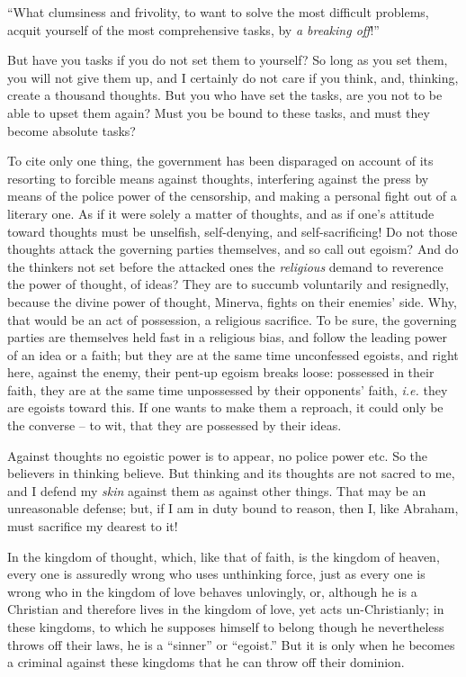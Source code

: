 \documentclass[12pt,a4paper]{book}
\begin{document}
``What clumsiness and frivolity, to want to solve the most difficult 
problems, acquit yourself of the most comprehensive tasks, by \textit{a 
breaking off}!''

But have you tasks if you do not set them to yourself? So long as you set 
them, you will not give them up, and I certainly do not care if you think, 
and, thinking, create a thousand thoughts. But you who have set the tasks, are 
you not to be able to upset them again? Must you be bound to these tasks, and 
must they become absolute tasks?

To cite only one thing, the government has been disparaged on account of its 
resorting to forcible means against thoughts, interfering against the press by 
means of the police power of the censorship, and making a personal fight out 
of a literary one. As if it were solely a matter of thoughts, and as if one's 
attitude toward thoughts must be unselfish, self-denying, and 
self-sacrificing! Do not those thoughts attack the governing parties 
themselves, and so call out egoism? And do the thinkers not set before the 
attacked ones the \textit{religious} demand to reverence the power of thought, 
of ideas? They are to succumb voluntarily and resignedly, because the divine 
power of thought, Minerva, fights on their enemies' side. Why, that would be 
an act of possession, a religious sacrifice. To be sure, the governing parties 
are themselves held fast in a religious bias, and follow the leading power of 
an idea or a faith; but they are at the same time unconfessed egoists, and 
right here, against the enemy, their pent-up egoism breaks loose: possessed in 
their faith, they are at the same time unpossessed by their opponents' faith, 
\textit{i.e.} they are egoists toward this. If one wants to make them a 
reproach, it could only be the converse -- to wit, that they are possessed by 
their ideas.

Against thoughts no egoistic power is to appear, no police power etc. So the 
believers in thinking believe. But thinking and its thoughts are not sacred to 
me, and I defend my \textit{skin} against them as against other things. That 
may be an unreasonable defense; but, if I am in duty bound to reason, then I, 
like Abraham, must sacrifice my dearest to it!

In the kingdom of thought, which, like that of faith, is the kingdom of 
heaven, every one is assuredly wrong who uses unthinking force, just as every 
one is wrong who in the kingdom of love behaves unlovingly, or, although he is 
a Christian and therefore lives in the kingdom of love, yet acts 
un-Christianly; in these kingdoms, to which he supposes himself to belong 
though he nevertheless throws off their laws, he is a ``sinner'' or 
``egoist.'' But it is only when he becomes a criminal against these kingdoms 
that he can throw off their dominion.
\end{document}
